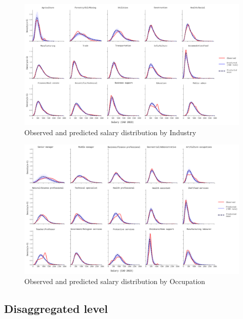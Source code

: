 \begin{landscape}
\begin{figure}[H]
    \centering
    \includegraphics[width=1.3\textwidth]{images/ch5_agg_level/salary_ind.png}
    \caption{Observed and predicted salary distribution by Industry}
    \setlength{\abovecaptionskip}{-30pt}
    \label{fig:validation_industry}
\end{figure}


\begin{figure}[H]
    \centering
    \includegraphics[width=1.3\textwidth]{images/ch5_agg_level/salary_occ.png}
    \caption{Observed and predicted salary distribution by Occupation}
    \setlength{\abovecaptionskip}{-15pt}
    \label{fig:validation_occupation}
\end{figure}
\end{landscape}

\subsection{Disaggregated level }

